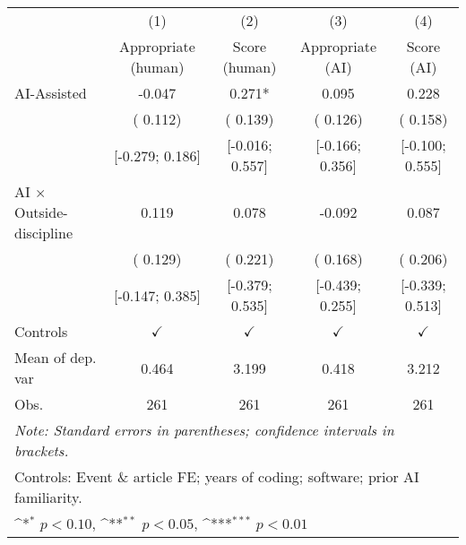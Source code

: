 \def\sym#1{\ifmmode^{#1}\else\(^{#1}\)\fi}
\begin{tabular}{l*{4}{c}}
\hline\hline
 & (1) & (2) & (3) & (4)
\\
 & Appropriate (human) & Score (human) & Appropriate (AI) & Score (AI)
 \\
\hline
AI-Assisted & -0.047 &  0.271* &  0.095 &  0.228
\\
 & ( 0.112) & ( 0.139) & ( 0.126) & ( 0.158)
\\
 & [-0.279;  0.186] & [-0.016;  0.557] & [-0.166;  0.356] & [-0.100;  0.555]
\\
AI × Outside-discipline &  0.119 &  0.078 & -0.092 &  0.087
\\
 & ( 0.129) & ( 0.221) & ( 0.168) & ( 0.206)
\\
 & [-0.147;  0.385] & [-0.379;  0.535] & [-0.439;  0.255] & [-0.339;  0.513]
\\
\hline
Controls & $\checkmark$ & $\checkmark$ & $\checkmark$ & $\checkmark$
\\
Mean of dep. var &  0.464 &  3.199 &  0.418 &  3.212
\\
Obs. & 261 & 261 & 261 & 261
\\
\hline
\hline\hline
\multicolumn{5}{l}{\it{Note:} Standard errors in parentheses; confidence intervals in brackets.}\\
\multicolumn{5}{l}{Controls: Event \& article FE; years of coding; software; prior AI familiarity.}\\
\multicolumn{5}{l}{\sym{*} $p<0.10$, \sym{**} $p<0.05$,  \sym{***} $p<0.01$}\\
\end{tabular}
